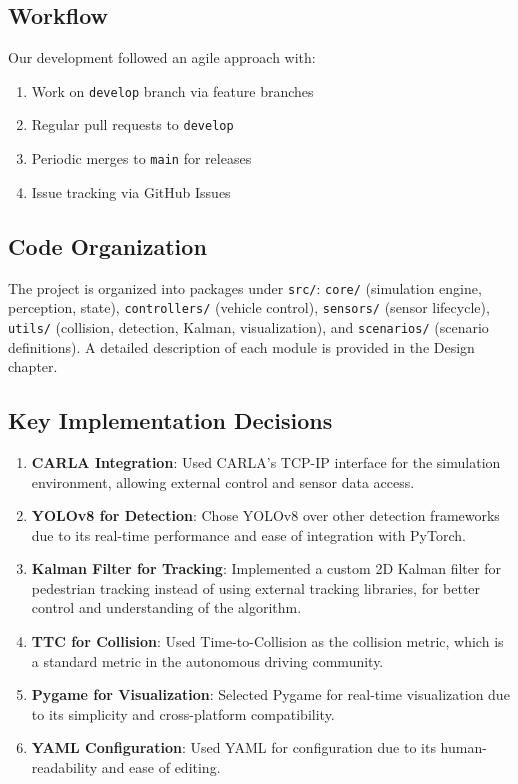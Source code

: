 \subsection{Workflow}

Our development followed an agile approach with:
\begin{enumerate}
    \item Work on \texttt{develop} branch via feature branches
    \item Regular pull requests to \texttt{develop}
    \item Periodic merges to \texttt{main} for releases
    \item Issue tracking via GitHub Issues
\end{enumerate}

\subsection{Code Organization}

The project is organized into packages under \texttt{src/}: \texttt{core/} (simulation engine, perception, state), \texttt{controllers/} (vehicle control), \texttt{sensors/} (sensor lifecycle), \texttt{utils/} (collision, detection, Kalman, visualization), and \texttt{scenarios/} (scenario definitions). A detailed description of each module is provided in the Design chapter.

\subsection{Key Implementation Decisions}

\begin{enumerate}
    \item \textbf{CARLA Integration}: Used CARLA's TCP-IP interface for the simulation environment, allowing external control and sensor data access.

    \item \textbf{YOLOv8 for Detection}: Chose YOLOv8 over other detection frameworks due to its real-time performance and ease of integration with PyTorch.

    \item \textbf{Kalman Filter for Tracking}: Implemented a custom 2D Kalman filter for pedestrian tracking instead of using external tracking libraries, for better control and understanding of the algorithm.

    \item \textbf{TTC for Collision}: Used Time-to-Collision as the collision metric, which is a standard metric in the autonomous driving community.

    \item \textbf{Pygame for Visualization}: Selected Pygame for real-time visualization due to its simplicity and cross-platform compatibility.

    \item \textbf{YAML Configuration}: Used YAML for configuration due to its human-readability and ease of editing.
\end{enumerate}

